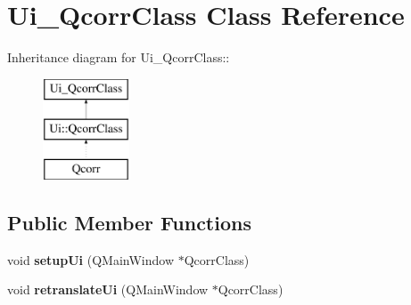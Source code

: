 \hypertarget{classUi__QcorrClass}{
\section{Ui\_\-QcorrClass Class Reference}
\label{classUi__QcorrClass}
}
Inheritance diagram for Ui\_\-QcorrClass::\begin{figure}[H]
\begin{center}
\leavevmode
\includegraphics[height=3cm]{classUi__QcorrClass}
\end{center}
\end{figure}
\subsection*{Public Member Functions}
\begin{DoxyCompactItemize}
\item 
\hypertarget{classUi__QcorrClass_a80aee2ed06f3c4f9b1f516405d888c13}{
void {\bfseries setupUi} (QMainWindow $\ast$QcorrClass)}
\label{classUi__QcorrClass_a80aee2ed06f3c4f9b1f516405d888c13}

\item 
\hypertarget{classUi__QcorrClass_adefed69462e2297254f0d5bce3131e05}{
void {\bfseries retranslateUi} (QMainWindow $\ast$QcorrClass)}
\label{classUi__QcorrClass_adefed69462e2297254f0d5bce3131e05}

\end{DoxyCompactItemize}
